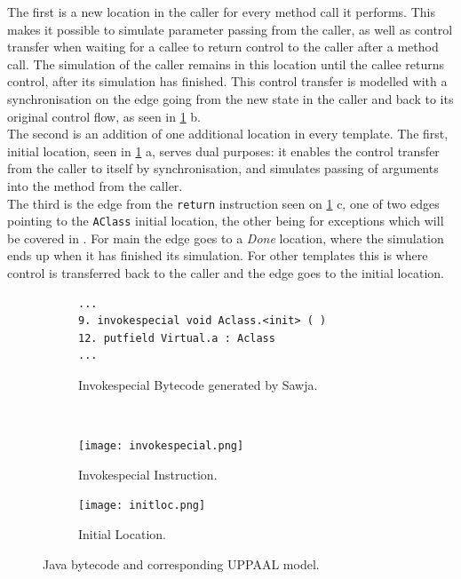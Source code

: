 The first is a new location in the caller for every method call it performs. This makes it possible to simulate parameter passing from the caller, as well as control transfer when waiting for a callee to return control to the caller after a method call. The simulation of the caller remains in this location until the callee returns control, after its simulation has finished. This control transfer is modelled with a synchronisation on the edge going from the new state in the caller and back to its original control flow, as seen in \cref{fig:invokespecial} b.\\

The second is an addition of one additional location in every template. The first, initial location, seen in \cref{fig:invokespecial} a, serves dual purposes: it enables the control transfer from the caller to itself by synchronisation, and simulates passing of arguments into the method from the caller. \\

The third is the edge from the \texttt{return} instruction seen on \cref{fig:invokespecial} c, one of two edges pointing to the \texttt{AClass} initial location, the other being for exceptions which will be covered in . For main the edge goes to a \textit{Done} location, where the simulation ends up when it has finished its simulation. For other templates this is where control is transferred back to the caller and the edge goes to the initial location.


\begin{figure}
\centering
\begin{subfigure}{\textwidth}
  \begin{lstlisting}
...
9. invokespecial void Aclass.<init> ( )
12. putfield Virtual.a : Aclass
...
  \end{lstlisting}
  \caption{Invokespecial Bytecode generated by Sawja.}
\end{subfigure} \\
\begin{subfigure}{.65\textwidth}
  \texttt{[image: invokespecial.png]}
  \caption{Invokespecial Instruction.}
\end{subfigure}
\hspace{10px}
\begin{subfigure}{.25\textwidth}
  \texttt{[image: initloc.png]}
  \caption{Initial Location.}
\end{subfigure}
\caption{Java bytecode and corresponding UPPAAL model.}
\label{fig:invokespecial}
\end{figure}



